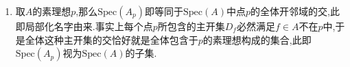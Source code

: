 \begin{enumerate}
\begin{proof}
		第四条说明$(S^{-1}f)_1'$是$(S^{-1}f)'$在$V((S^{-1}p)^e)$上的限制,第三条说明$(S^{-1}f)'$是$f'$在$(f')^{-1}(X_1)$上的限制,其中$X_1$是$\mathrm{Spec}(S^{-1}A)$在$\mathrm{Spec}(A)$上的像.于是$(f')^{-1}(p)$即等同于$\mathrm{Spec}(S^{-1}B/(S^{-1}p)^e)$,也即$\mathrm{Spec}(S^{-1}B/(S^{-1}p)S^{-1}B)$.最后注意到如下同构式,即完成证明:
		\begin{align*}
			S^{-1}B/(S^{-1}p)S^{-1}B&\cong S^{-1}A/S^{-1}p\otimes_{S^{-1}A}S^{-1}B\\
			&\cong S^{-1}(A/p)\otimes_{S^{-1}A}S^{-1}B\\
			&\cong (A/p\otimes_AS^{-1}A)\otimes_{S^{-1}A}S^{-1}B\\
			&\cong A/p\otimes_A(S^{-1}A\otimes_{S^{-1}A}S^{-1}B)\\
			&\cong A/p\otimes_AS^{-1}B\\
			&\cong A/p\otimes_A(S^{-1}A\otimes_AB)\\
			&\cong k(p)\otimes_AB
		\end{align*}
	\end{proof}
	\item 取$A$的素理想$p$,那么$\mathrm{Spec}(A_p)$即等同于$\mathrm{Spec}(A)$中点$p$的全体开邻域的交,此即局部化名字由来.事实上每个点$p$所包含的主开集$D_f$必然满足$f\in A$不在$p$中,于是全体这种主开集的交恰好就是全体包含于$p$的素理想构成的集合,此即$\mathrm{Spec}(A_p)$视为$\mathrm{Spec}(A)$的子集.
\end{enumerate}



